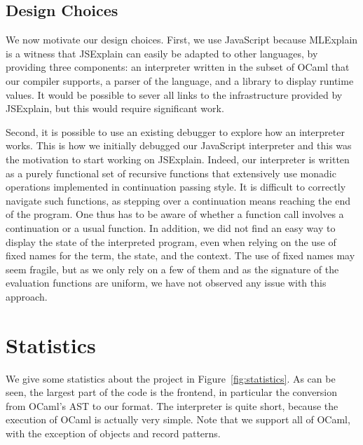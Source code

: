 \documentclass[twocolumn,a4paper]{article}
\begin{document}
\subsection{Design Choices}\label{subsec:design}

We now motivate our design choices. First, we use JavaScript because MLExplain
is a witness that JSExplain can easily be adapted to other languages, by
providing three components: an interpreter written in the subset of OCaml that
our compiler supports, a parser of the language, and a library to display
runtime values. It would be possible to sever all links to the infrastructure
provided by JSExplain, but this would require significant work.

Second, it is possible to use an existing debugger to explore how an interpreter
works. This is how we initially debugged our JavaScript interpreter and this was
the motivation to start working on JSExplain. Indeed, our interpreter is written
as a purely functional set of recursive functions that extensively use monadic
operations implemented in continuation passing style. It is difficult to
correctly navigate such functions, as stepping over a continuation means
reaching the end of the program. One thus has to be aware of whether a function
call involves a continuation or a usual function. In addition, we did not find
an easy way to display the state of the interpreted program, even when relying
on the use of fixed names for the term, the state, and the context. The use of
fixed names may seem fragile, but as we only rely on a few of them and as the
signature of the evaluation functions are uniform, we have not observed any
issue with this approach.

\section{Statistics}

We give some statistics about the project in Figure~\ref{fig:statistics}. As can
be seen, the largest part of the code is the frontend, in particular the
conversion from OCaml's AST to our format. The interpreter is quite short,
because the execution of OCaml is actually very simple. Note that we support all
of OCaml, with the exception of objects and record patterns.
\end{document}
